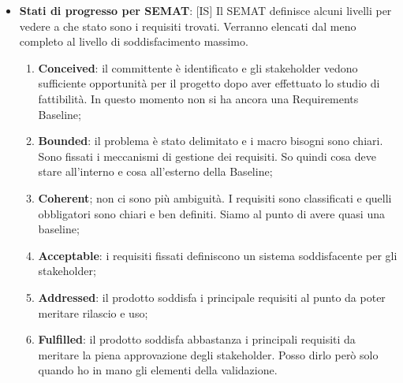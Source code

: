 \begin{itemize}
	\item \textbf{Stati di progresso per SEMAT}: [IS] Il SEMAT definisce alcuni livelli per vedere a che stato sono i requisiti trovati. Verranno elencati dal meno completo al livello di soddisfacimento massimo.
		\begin{enumerate}
			\item \textbf{Conceived}: il committente è identificato e gli stakeholder vedono sufficiente opportunità per il progetto dopo aver effettuato lo studio di fattibilità. In questo momento non si ha ancora una Requirements Baseline;
			\item \textbf{Bounded}: il problema è stato delimitato e i macro bisogni sono chiari. Sono fissati i meccanismi di gestione dei requisiti. So quindi cosa deve stare all'interno e cosa all'esterno della Baseline;
			\item \textbf{Coherent}; non ci sono più ambiguità. I requisiti sono classificati e quelli obbligatori sono chiari e ben definiti. Siamo al punto di avere quasi una baseline;
			\item \textbf{Acceptable}: i requisiti fissati definiscono un sistema soddisfacente per gli stakeholder;
			\item \textbf{Addressed}: il prodotto soddisfa i principale requisiti al punto da poter meritare rilascio e uso;
			\item \textbf{Fulfilled}: il prodotto soddisfa abbastanza i principali requisiti da meritare la piena approvazione degli stakeholder. Posso dirlo però solo quando ho in mano gli elementi della validazione.
		\end{enumerate}


\end{itemize}
